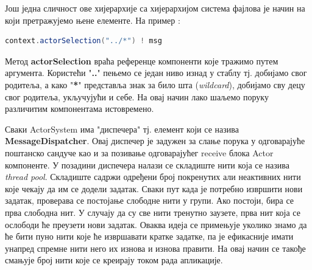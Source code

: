 \documentclass[12pt,oneside]{memoir}
\begin{document}
Још једна сличност ове хијерархије са хијерархијом система фајлова је начин на који претражујемо њене елементе. На пример \cite{akkaDoc}:
\begin{lstlisting}[language=Scala]
context.actorSelection("../*") ! msg
\end{lstlisting}
Метод \textbf{actorSelection} враћа референце компоненти које тражимо путем аргумента. Користећи "\textbf{..}" пењемо се један ниво изнад у стаблу тј. добијамо свог родитеља, а како "\textbf{*}" представља знак за било шта (\textit{wildcard}), добијамо сву децу свог родитеља, укључујући и себе. На овај начин лако шаљемо поруку различитим компонентама истовремено.
\\
\par Сваки ActorSystem има "диспечера" тј. елемент који се назива \textbf{MessageDispatcher}. Овај диспечер је задужен за слање порука у одговарајуће поштанско сандуче као и за позивање одговарајућег receive блока Actor компоненте. У позадини диспечера налази се складиште нити која се назива \textit{thread pool}. Складиште садржи одређени број покренутих али неактивних нити које чекају да им се додели задатак. Сваки пут када је потребно извршити нови задатак, проверава се постојање слободне нити у групи. Ако постоји, бира се прва слободна нит. У случају да су све нити тренутно заузете, прва нит која се ослободи ће преузети нови задатак. Оваква идеја се примењује уколико знамо да ће бити пуно нити које ће извршавати кратке задатке, па је ефикасније имати унапред спремне нити него их изнова и изнова правити. На овај начин се такође смањује број нити које се креирају током рада апликације.
\end{document}
